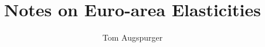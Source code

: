 \documentclass[12pt,a4paper]{article}                      %
\begin{document}

\title{Notes on Euro-area Elasticities}
\author{Tom Augspurger}                               %
\maketitle










\end{document}
